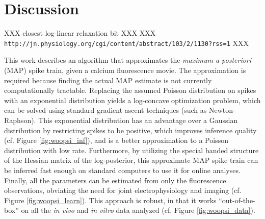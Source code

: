 \section{Discussion} \label{sec:dis}


XXX closest log-linear relaxation bit XXX
XXX \texttt{http://jn.physiology.org/cgi/content/abstract/103/2/1130?rss=1} XXX



This work describes an algorithm that approximates the \emph{maximum a posteriori} (MAP) spike train, given a calcium fluorescence movie.  The approximation is required because finding the actual MAP estimate is not currently computationally tractable.  Replacing the assumed Poisson distribution on spikes with an exponential distribution yields a log-concave optimization problem, which can be solved using standard gradient ascent techniques (such as Newton-Raphson).  This exponential distribution has an advantage over a Gaussian distribution by restricting spikes to be positive, which improves inference quality (cf. Figure \ref{fig:woopsi_inf}), and is a better approximation to a Poisson distribution with low rate.  %
Furthermore, by utilizing the special banded structure of the Hessian matrix of the log-posterior, this approximate MAP spike train can be inferred fast enough on standard computers to use it for online analyses.  Finally, all the parameters can be estimated from only the fluorescence observations, obviating the need for joint electrophysiology and imaging (cf. Figure \ref{fig:woopsi_learn}).  This approach is robust, in that it works ``out-of-the-box'' on all the \emph{in vivo} and \emph{in vitro} data analyzed (cf. Figure \ref{fig:woopsi_data}).

